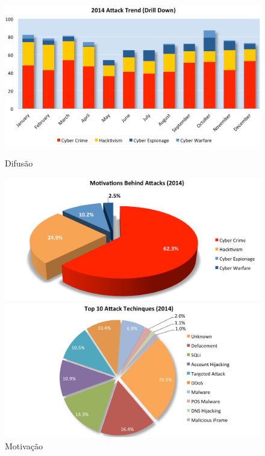 \begin{figure}
	\begin{minipage}{.5\textwidth}
	\includegraphics[scale=0.2]{Imagens/hackmageddon_trends.png}
		\caption{Difusão}
	\end{minipage}
	\begin{minipage}{.5\textwidth}
		\includegraphics[scale=0.2]{Imagens/hackmageddon_motivation.png}
		\caption{Motivação}
	\end{minipage}
	\begin{minipage}{.5\textwidth}
		\includegraphics[scale=0.2]{Imagens/hackmageddon_techniques.png}

\end{minipage}
\end{figure}
